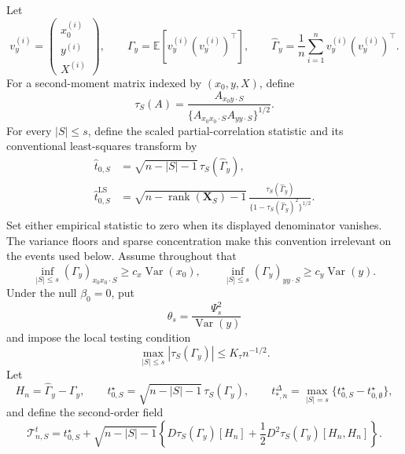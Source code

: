 \documentclass[a4paper,11pt,english]{article}
\newcommand{\E}{\mathbb E}
\newcommand{\Var}{\operatorname{Var}}
\begin{document}
Let
\begin{equation*}
        v_y^{(i)}
        =\begin{pmatrix}x_0^{(i)}\\y^{(i)}\\X^{(i)}\end{pmatrix},
        \qquad
        \Gamma_y=\E[v_y^{(i)}(v_y^{(i)})^\top],
        \qquad
        \hat\Gamma_y=\frac1n\sum_{i=1}^n
        v_y^{(i)}(v_y^{(i)})^\top .
\end{equation*}
For a second-moment matrix indexed by $(x_0,y,X)$, define
\begin{equation}\label{eq:t-functional}
        \tau_S(A)
        =\frac{A_{x_0y\mathbin{\cdot}S}}
        {\{A_{x_0x_0\mathbin{\cdot}S}A_{yy\mathbin{\cdot}S}\}^{1/2}} .
\end{equation}
For every $|S|\le s$, define the scaled partial-correlation statistic
and its conventional least-squares transform by
\begin{align}
        \hat t_{0,S}
        &=\sqrt{n-|S|-1}\,\tau_S(\hat\Gamma_y),
        \label{eq:studentized-moment-identity}\\
        \hat t^{\mathrm{LS}}_{0,S}
        &=\sqrt{n-\operatorname{rank}(\mathbf X_S)-1}\,
        \frac{\tau_S(\hat\Gamma_y)}
        {\{1-\tau_S(\hat\Gamma_y)^2\}^{1/2}} .
        \label{eq:conventional-t-definition}
\end{align}
Set either empirical statistic to zero when its displayed denominator
vanishes.  The variance floors and sparse concentration make this convention
irrelevant on the events used below.
Assume throughout that
\begin{equation}\label{eq:t-floors}
        \inf_{|S|\le s}(\Gamma_y)_{x_0x_0\mathbin{\cdot}S}
        \ge c_x\Var(x_0),
        \qquad
        \inf_{|S|\le s}(\Gamma_y)_{yy\mathbin{\cdot}S}
        \ge c_y\Var(y).
\end{equation}
Under the null $\beta_0=0$, put
\begin{equation*}
        \theta_s=\frac{\Psi_s^2}{\Var(y)}
\end{equation*}
and impose the local testing condition
\begin{equation}\label{eq:local-testing-condition}
        \max_{|S|\le s}|\tau_S(\Gamma_y)|
        \le K_\tau n^{-1/2}.
\end{equation}
Let
\begin{equation*}
        H_n=\hat\Gamma_y-\Gamma_y,
        \qquad
        t_{0,S}^\star
        =\sqrt{n-|S|-1}\,\tau_S(\Gamma_y),
        \qquad
        t_{*,n}^\Delta
        =\max_{|S|=s}\{t_{0,S}^\star-t_{0,\emptyset}^\star\},
\end{equation*}
and define the second-order field
\begin{equation}\label{eq:studentized-second-order-field}
        \mathcal T^t_{n,S}
        =t_{0,S}^\star+\sqrt{n-|S|-1}\left\{
        D\tau_S(\Gamma_y)[H_n]
        +\frac12D^2\tau_S(\Gamma_y)[H_n,H_n]
        \right\}.
\end{equation}
\end{document}
